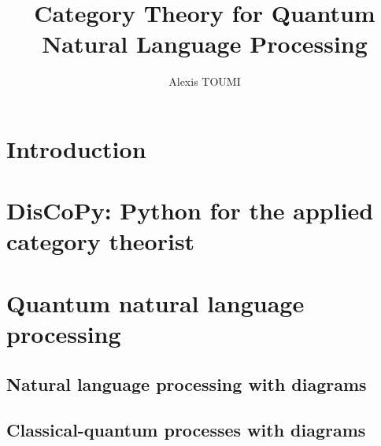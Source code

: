 

\title{Category Theory for Quantum\\
Natural Language Processing}
\author{Alexis TOUMI}

\degreedate{\today}




\begin{romanpages}
\maketitle



\tableofcontents

\end{romanpages}

\chapter*{Introduction}






\chapter{DisCoPy: Python for the applied category theorist}









\chapter{Quantum natural language processing} \label{chapter-2:qnlp}

\section{Natural language processing with diagrams}\label{section:NLP}
\section{Classical-quantum processes with diagrams}
